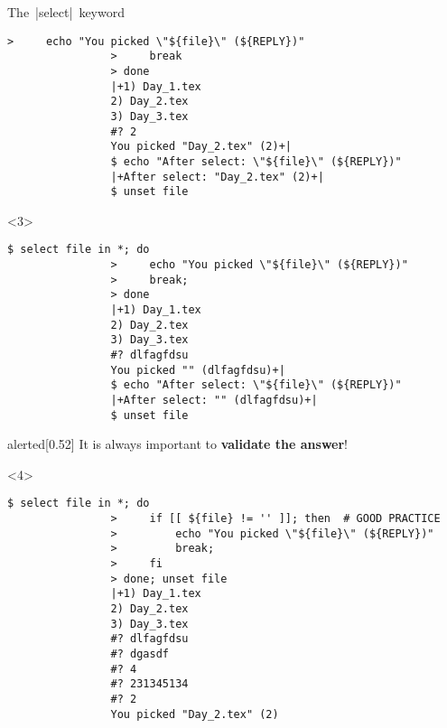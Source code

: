 \begin{frame}[fragile]{The \,\bash|select|\, keyword}
\begin{overlayarea}{\textwidth}{\textheight}
\begin{onlyenv}
\begin{lstlisting}[style=MyBash]
                >     echo "You picked \"${file}\" (${REPLY})"
                >     break
                > done
                |+1) Day_1.tex
                2) Day_2.tex
                3) Day_3.tex
                #? 2
                You picked "Day_2.tex" (2)+|
                $ echo "After select: \"${file}\" (${REPLY})"
                |+After select: "Day_2.tex" (2)+|
                $ unset file
            \end{lstlisting}
        \end{onlyenv}
        \begin{onlyenv}<3>
            \begin{lstlisting}[style=MyBash]
                $ select file in *; do
                >     echo "You picked \"${file}\" (${REPLY})"
                >     break;
                > done
                |+1) Day_1.tex
                2) Day_2.tex
                3) Day_3.tex
                #? dlfagfdsu
                You picked "" (dlfagfdsu)+|
                $ echo "After select: \"${file}\" (${REPLY})"
                |+After select: "" (dlfagfdsu)+|
                $ unset file
            \end{lstlisting}
            \medskip
            \begin{varblock}{alerted}[0.52\textwidth]{}
                It is always important to \alert{\textbf{validate the answer}}!
            \end{varblock}
        \end{onlyenv}
        \begin{onlyenv}<4>
            \begin{lstlisting}[style=MyBash]
                $ select file in *; do
                >     if [[ ${file} != '' ]]; then  # GOOD PRACTICE
                >         echo "You picked \"${file}\" (${REPLY})"
                >         break;
                >     fi
                > done; unset file
                |+1) Day_1.tex
                2) Day_2.tex
                3) Day_3.tex
                #? dlfagfdsu
                #? dgasdf
                #? 4
                #? 231345134
                #? 2
                You picked "Day_2.tex" (2)
            \end{lstlisting}
        \end{onlyenv}
    \end{overlayarea}
\end{frame}




















